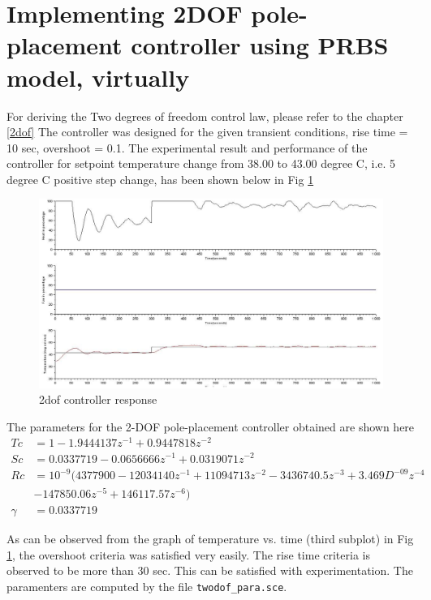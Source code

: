 \section{Implementing 2DOF pole-placement controller using PRBS model, virtually}

For deriving the Two degrees of freedom control law, please refer to the chapter \ref{2dof}
The controller was designed for the given transient conditions, rise time = 10 sec, overshoot = 0.1. The experimental result and performance of the controller for setpoint temperature change from 38.00 to 43.00 degree C, i.e. 5 degree C positive step change, has been shown below in Fig \ref{2dof-controller}

\begin{figure}
\centering
\includegraphics[width=0.9\linewidth]{prbs/prbs-2dof-controller.png}
\caption{2dof controller response}
\label{2dof-controller}
\end{figure}

 The parameters for the 2-DOF pole-placement controller obtained are shown here
\begin{align*}
Tc &= 1 - 1.9444137 z^{ -1} + 0.9447818 z^{ -2}\\
Sc &= 0.0337719 - 0.0656666z^{ -1}+ 0.0319071z^ { -2}\\
Rc &= 10^{-9} (4377900 - 12034140 z^{ -1} + 11094713 z^ {-2} - 3436740.5 z^{-3} + 3.469D^{-09} z ^{-4} \\&- 147850.06 z^ {-5} + 146117.57 z^{ -6} )\\
\gamma &= 0.0337719
\end{align*}

As can be observed from the graph of temperature vs. time (third subplot) in Fig \ref{2dof-controller}, the overshoot criteria was satisfied very easily. The rise time criteria is observed to be more than 30 sec. This can be satisfied with experimentation.
The paramenters are computed by the file {\tt twodof\_para.sce}.  


